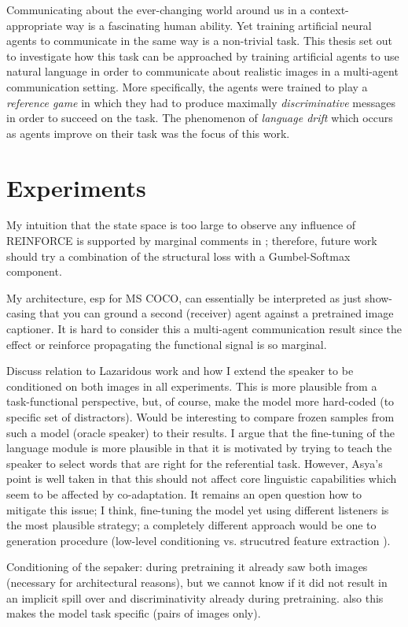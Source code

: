 Communicating about the ever-changing world around us in a context-appropriate way is a fascinating human ability. Yet training artificial neural agents to communicate in the same way is a non-trivial task. This thesis set out to investigate how this task can be approached by training artificial agents to use natural language in order to communicate about realistic images in a multi-agent communication setting. More specifically, the agents were trained to play a \emph{reference game} in which they had to produce maximally \emph{discriminative} messages in order to succeed on the task. The phenomenon of \emph{language drift} which occurs as agents improve on their task was the focus of this work.

\section{Experiments}
My intuition that the state space is too large to observe any influence of REINFORCE is supported by marginal comments in \cite{havrylov2017emergence}; therefore, future work should try a combination of the structural loss with a Gumbel-Softmax component.

My architecture, esp for MS COCO, can essentially be interpreted as just show-casing that you can ground a second (receiver) agent against a pretrained image captioner. It is hard to consider this a multi-agent communication result since the effect or reinforce propagating the functional signal is so marginal. 

Discuss relation to Lazaridous work and how I extend the speaker to be conditioned on both images in all experiments. This is more plausible from a task-functional perspective, but, of course, make the model more hard-coded (to specific set of distractors). Would be interesting to compare frozen samples from such a model (oracle speaker) to their results. I argue that the fine-tuning of the language module is more plausible in that it is motivated by trying to teach the speaker to select words that are right for the referential task. However, Asya's point is well taken in that this should not affect core linguistic capabilities which seem to be affected by co-adaptation. It remains an open question how to mitigate this issue; I think, fine-tuning the model yet using different listeners is the most plausible strategy; a completely different approach would be one to generation procedure (low-level conditioning vs. strucutred feature extraction ). 


Conditioning of the sepaker: during pretraining it already saw both images (necessary for architectural reasons), but we cannot know if it did not result in an implicit spill over and discriminativity already during pretraining. also this makes the model task specific (pairs of images only). 


